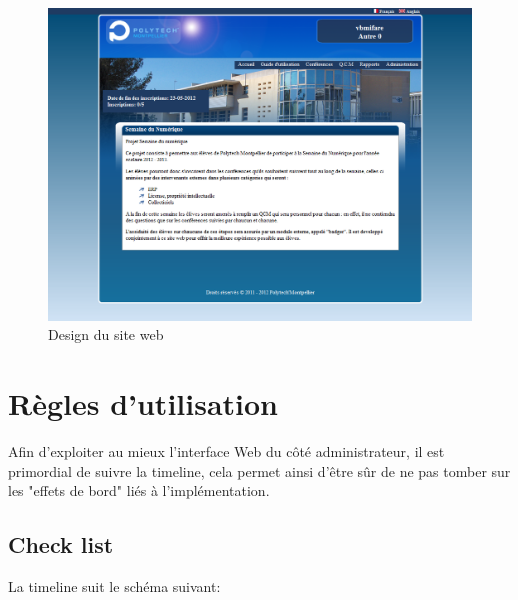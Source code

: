     \begin{figure}[h]
        \begin{center}
        \includegraphics[scale=0.4]{images/screenSiteWeb.png} 
        \end{center}
        \caption{Design du site web}
        \label{Design du site web}
    \end{figure}



    \section{Règles d'utilisation}

Afin d'exploiter au mieux l'interface Web du côté administrateur, il est primordial
de suivre la timeline, cela permet ainsi d'être sûr de ne pas tomber sur les "effets de bord"
liés à l'implémentation.

        \subsection{Check list}

La timeline suit le schéma suivant:

